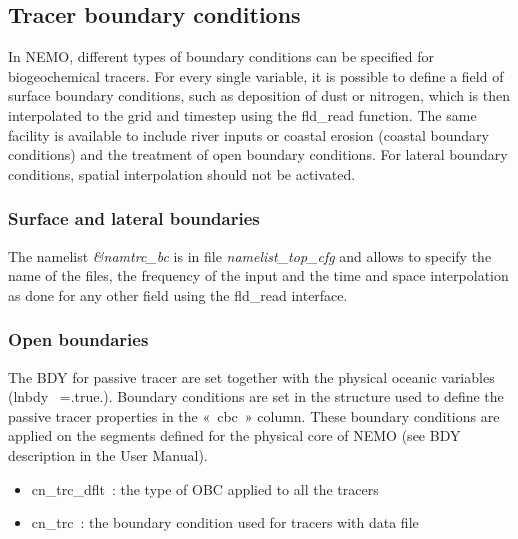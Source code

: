 \documentclass[../main/TOP_manual]{subfiles}
\begin{document}

\subsection{Tracer boundary conditions}

In NEMO, different types of boundary conditions can be specified for biogeochemical tracers. For every single variable, it is possible to define a field of surface boundary conditions, such as deposition of dust or nitrogen, which is then interpolated to the grid and timestep using the fld\_read function. The same facility is available to include river inputs or coastal erosion (coastal boundary conditions) and the treatment of open boundary conditions. For lateral boundary conditions, spatial interpolation should not be activated.


\subsubsection{Surface and lateral boundaries}

The namelist \textit{\&namtrc\_bc}  is in file \textit{namelist\_top\_cfg}  and allows to specify the name of the files, the frequency of the input and the time and space interpolation as done for any other field using the fld\_read interface.

\subsubsection{Open boundaries}

The BDY for passive tracer are set together with the physical oceanic variables (lnbdy  =.true.). Boundary conditions are set in the structure used to define the passive tracer properties in the « cbc » column. These boundary conditions are applied on the segments defined for the physical core of NEMO (see BDY description in the User Manual).
\begin{itemize}
	\item cn\_trc\_dflt : the type of OBC applied to all the tracers
	\item cn\_trc :  the boundary condition used for tracers with data file
\end{itemize} 
\end{document}
